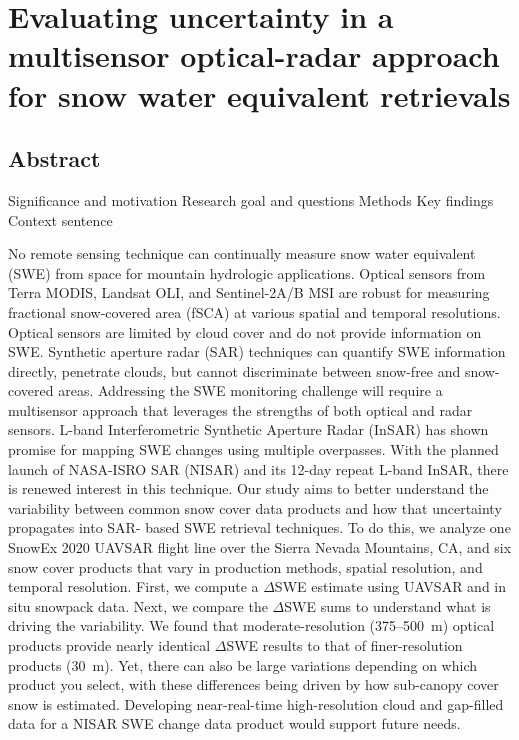 \hypertarget{ch4}{%
\chapter{Evaluating uncertainty in a multisensor optical-radar approach for snow water equivalent retrievals}\label{ch4}}


\hypertarget{ch4-abstract}{\section{Abstract}\label{ch4-abstract}}
Significance and motivation
Research goal and questions
Methods
Key findings
Context sentence

No remote sensing technique can continually measure snow water equivalent (SWE) from space for mountain hydrologic applications. Optical sensors from Terra MODIS, Landsat OLI, and Sentinel-2A/B MSI are robust for measuring fractional snow-covered area (fSCA) at various spatial and temporal resolutions. Optical sensors are limited by cloud cover and do not provide information on SWE. Synthetic aperture radar (SAR) techniques can quantify SWE information directly, penetrate clouds, but cannot discriminate between snow-free and snow-covered areas. Addressing the SWE monitoring challenge will require a multisensor approach that leverages the strengths of both optical and radar sensors. L-band Interferometric Synthetic Aperture Radar (InSAR) has shown promise for mapping SWE changes using multiple overpasses. With the planned launch of NASA-ISRO SAR (NISAR) and its 12-day repeat L-band InSAR, there is renewed interest in this technique. Our study aims to better understand the variability between common snow cover data products and how that uncertainty propagates into SAR-
based SWE retrieval techniques. To do this, we analyze one SnowEx 2020 UAVSAR flight line over the Sierra Nevada Mountains, CA, and six snow cover products that vary in production methods, spatial resolution, and temporal resolution. First, we compute a $\Delta$SWE estimate using UAVSAR and in situ snowpack data. Next, we compare the $\Delta$SWE sums to understand what is driving the variability. We found that moderate-resolution (375--500~m) optical products provide nearly identical $\Delta$SWE results to that of finer-resolution products (30~m). Yet, there can also be large variations depending on which product you select, with these differences being driven by how sub-canopy cover snow is estimated. Developing near-real-time high-resolution cloud and gap-filled data for a NISAR SWE change data product would support future needs.

